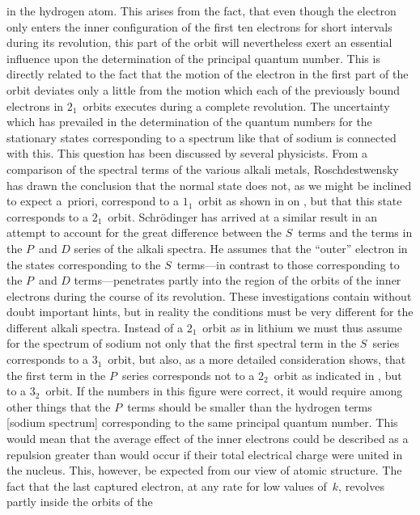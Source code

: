 in the hydrogen atom. This arises from the fact, that even
though the electron only enters the inner configuration of the first
ten electrons for short intervals during its revolution, this part of
the orbit will nevertheless exert an essential influence upon the
determination of the principal quantum number. This is directly
related to the fact that the motion of the electron in the first part
of the orbit deviates only a little from the motion which each of
the previously bound electrons in $2_{1}$~orbits executes during a complete
revolution. The uncertainty which has prevailed in the
determination of the quantum numbers for the stationary states
corresponding to a spectrum like that of sodium is connected with
this. This question has been discussed by several physicists. From
a comparison of the spectral terms of the various alkali metals,
Roschdestwensky has drawn the conclusion that the normal state
does not, as we might be inclined to expect a~priori, correspond to
a $1_{1}$~orbit as shown in  on , but that this state corresponds
to a $2_{1}$~orbit. Schrödinger has arrived at a similar result
in an attempt to account for the great difference between the
$S$~terms and the terms in the $P$~and $D$ series of the alkali spectra.
He assumes that the ``outer'' electron in the states corresponding
to the $S$~terms---in contrast to those corresponding to the $P$~and
$D$ terms---penetrates partly into the region of the orbits of the
inner electrons during the course of its revolution. These investigations
contain without doubt important hints, but in reality the
conditions must be very different for the different alkali spectra.
Instead of a $2_{1}$~orbit as in lithium we must thus assume for
the spectrum of sodium not only that the first spectral term in
the $S$~series corresponds to a $3_{1}$~orbit, but also, as a more detailed
consideration shows, that the first term in the $P$~series corresponds
not to a $2_{2}$~orbit as indicated in , but to a $3_{2}$~orbit. If the
numbers in this figure were correct, it would require among other
things that the $P$~terms should be smaller than the hydrogen terms
[sodium spectrum]
corresponding to the same principal quantum number. This would
mean that the average effect of the inner electrons could be described
as a repulsion greater than would occur if their total electrical charge
were united in the nucleus. This, however,  be expected from
our view of atomic structure. The fact that the last captured electron,
at any rate for low values of~$k$, revolves partly inside the orbits of the
